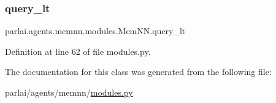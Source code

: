 \subsubsection{\texorpdfstring{query\+\_\+lt}{query\_lt}}
{\footnotesize\ttfamily parlai.\+agents.\+memnn.\+modules.\+Mem\+N\+N.\+query\+\_\+lt}



Definition at line 62 of file modules.\+py.



The documentation for this class was generated from the following file\+:\begin{DoxyCompactItemize}
\item 
parlai/agents/memnn/\hyperlink{parlai_2agents_2memnn_2modules_8py}{modules.\+py}\end{DoxyCompactItemize}
